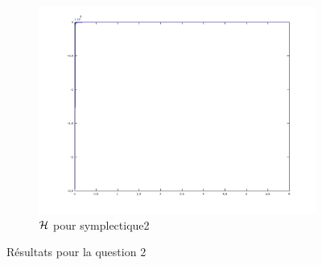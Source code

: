\begin{figure}
\begin{subfigure}[b]{0.3\textwidth}
    \includegraphics[width=\textwidth]{images/Q2_symplectique2_H.png}
    \caption{$\mathcal{H}$ pour symplectique2}
    \label{fig:q2_symplectique2_H}
  \end{subfigure}
  \caption{Résultats pour la question 2}\label{fig:q2}
\end{figure}
